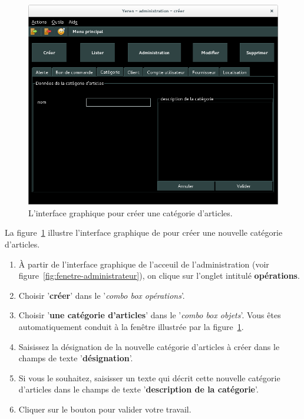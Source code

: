 
\newpage
{}

\begin{figure}[!htpb]
	\centering
	\includegraphics[scale=0.45]{images/categorie-articles-creer.png}
	\caption{L'interface graphique pour cr\'eer une cat\'egorie d'articles.}
	\label{fig:admin-categories-articles-creer}
\end{figure}

La figure~\ref{fig:admin-categories-articles-creer} illustre
l'interface graphique de \yeroth pour cr\'eer une nouvelle
cat\'egorie d'articles.

\begin{enumerate}[1)]
	\item \`A partir de l'interface graphique de l'acceuil de
		l'administration (voir figure~\ref{fig:fenetre-administrateur}),
		on clique sur l'onglet intitul\'e \textbf{op\'erations}. 
		
	\item Choisir '\textbf{cr\'eer}' dans le '\emph{combo box
		op\'erations}'.
		
	\item Choisir '\textbf{une cat\'egorie d'articles}' dans
		le '\emph{combo box objets}'. Vous \^etes automatiquement
		conduit \`a la fen\^etre illustr\'ee par la
		figure~\ref{fig:admin-categories-articles-creer}.
		
	\item Saisissez la d\'esignation de la nouvelle cat\'egorie
		d'articles \`a cr\'eer dans le champs de texte
		'\textbf{d\'esignation}'.

	\item Si vous le souhaitez, saisisser un texte qui d\'ecrit
		cette nouvelle cat\'egorie d'articles dans le champs de
		texte '\textbf{description de la cat\'egorie}'.
		
	\item Cliquer sur le bouton  pour
		valider votre travail.		
\end{enumerate}

